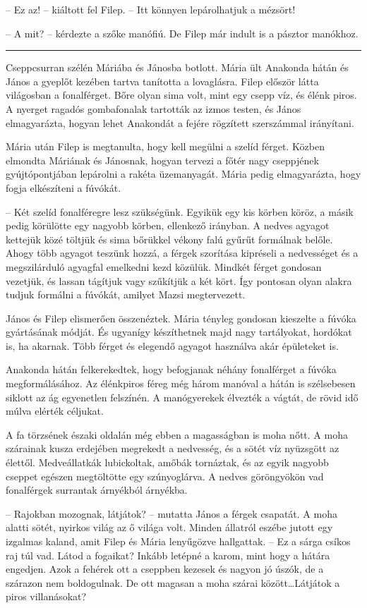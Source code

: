 \documentclass[10pt]{memoir}
\renewcommand{\pfbreakdisplay}{\bigskip \ding{166} \bigskip}
\newcommand{\secbreak}{\fancybreak{\pfbreakdisplay}\indent}
\begin{document}
-- Ez az! -- kiáltott fel Filep. -- Itt könnyen lepárolhatjuk a mézsört!

-- A mit? -- kérdezte a szőke manófiú. De Filep már indult is a pásztor
manókhoz.

\secbreak

Cseppcsurran szélén Máriába és Jánosba botlott. Mária ült Anakonda hátán és
János a gyeplőt kezében tartva tanította a lovaglásra. Filep először látta
világosban a fonalférget. Bőre olyan sima volt, mint egy csepp víz, és élénk
piros. A nyerget ragadós gombafonalak tartották az izmos testen, és János
elmagyarázta, hogyan lehet Anakondát a fejére rögzített szerszámmal irányítani.

Mária után Filep is megtanulta, hogy kell megülni a szelíd férget. Közben
elmondta Máriának és Jánosnak, hogyan tervezi a főtér nagy cseppjének
gyújtópontjában lepárolni a rakéta üzemanyagát. Mária pedig elmagyarázta, hogy
fogja elkészíteni a fúvókát.

-- Két szelíd fonalféregre lesz szükségünk. Egyikük egy kis körben köröz, a
másik pedig körülötte egy nagyobb körben, ellenkező irányban. A nedves agyagot
kettejük közé töltjük és sima bőrükkel vékony falú gyűrűt formálnak belőle.
Ahogy több agyagot teszünk hozzá, a férgek szorítása kipréseli a nedvességet és
a megszilárduló agyagfal emelkedni kezd közülük. Mindkét férget gondosan
vezetjük, és lassan tágítjuk vagy szűkítjük a két kört. Így pontosan olyan
alakra tudjuk formálni a fúvókát, amilyet Mazsi megtervezett.

János és Filep elismerően összenéztek. Mária tényleg gondosan kieszelte a
fúvóka gyártásának módját. És ugyanígy készíthetnek majd nagy tartályokat,
hordókat is, ha akarnak. Több férget és elegendő agyagot használva akár
épületeket is.

Anakonda hátán felkerekedtek, hogy befogjanak néhány fonalférget a fúvóka
megformálásához. Az élénkpiros féreg még három manóval a hátán is szélsebesen
siklott az ág egyenetlen felszínén. A manógyerekek élvezték a vágtát, de rövid
idő múlva elérték céljukat.

A fa törzsének északi oldalán még ebben a magasságban is moha nőtt. A moha
szárainak kusza erdejében megrekedt a nedvesség, és a sötét víz nyüzsgött az
élettől. Medveállatkák lubickoltak, amőbák tornáztak, és az egyik nagyobb
cseppet egészen megtöltötte egy szúnyoglárva. A nedves göröngyökön vad
fonalférgek surrantak árnyékból árnyékba.

-- Rajokban mozognak, látjátok? -- mutatta János a férgek csapatát. A moha
alatti sötét, nyirkos világ az ő világa volt. Minden állatról eszébe jutott egy
izgalmas kaland, amit Filep és Mária lenyűgözve hallgattak. -- Ez a sárga
csíkos raj túl vad. Látod a fogaikat? Inkább letépné a karom, mint hogy a
hátára engedjen. Azok a fehérek ott a cseppben kezesek és nagyon jó úszók, de a
szárazon nem boldogulnak. De ott magasan a moha szárai között\dots Látjátok a
piros villanásokat?
\end{document}
